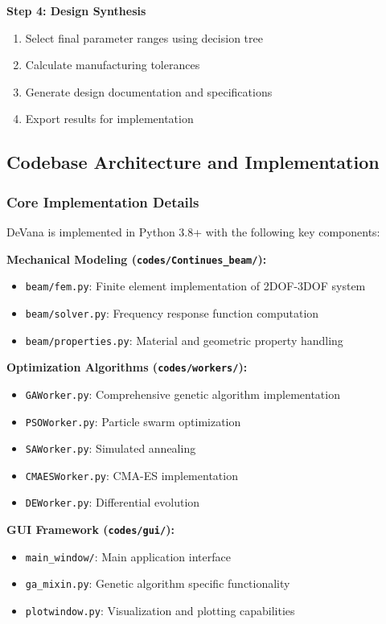 \documentclass[12pt,a4paper]{article}
\newcommand{\softwareName}{DeVana}
\begin{document}
\textbf{Step 4: Design Synthesis}
\begin{enumerate}
    \item Select final parameter ranges using decision tree
    \item Calculate manufacturing tolerances
    \item Generate design documentation and specifications
    \item Export results for implementation
\end{enumerate}

\subsection{Codebase Architecture and Implementation}

\subsubsection{Core Implementation Details}

\softwareName{} is implemented in Python 3.8+ with the following key components:

\textbf{Mechanical Modeling (\texttt{codes/Continues\_beam/}):}
\begin{itemize}
    \item \texttt{beam/fem.py}: Finite element implementation of 2DOF-3DOF system
    \item \texttt{beam/solver.py}: Frequency response function computation
    \item \texttt{beam/properties.py}: Material and geometric property handling
\end{itemize}

\textbf{Optimization Algorithms (\texttt{codes/workers/}):}
\begin{itemize}
    \item \texttt{GAWorker.py}: Comprehensive genetic algorithm implementation
    \item \texttt{PSOWorker.py}: Particle swarm optimization
    \item \texttt{SAWorker.py}: Simulated annealing
    \item \texttt{CMAESWorker.py}: CMA-ES implementation
    \item \texttt{DEWorker.py}: Differential evolution
\end{itemize}

\textbf{GUI Framework (\texttt{codes/gui/}):}
\begin{itemize}
    \item \texttt{main\_window/}: Main application interface
    \item \texttt{ga\_mixin.py}: Genetic algorithm specific functionality
    \item \texttt{plotwindow.py}: Visualization and plotting capabilities
\end{itemize}
\end{document}
